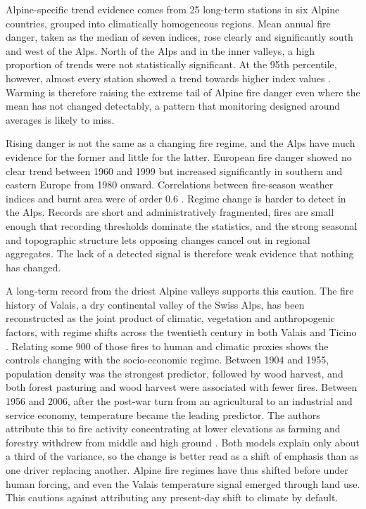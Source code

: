 \documentclass[11pt,a4paper]{article}
\begin{document}
Alpine-specific trend evidence comes from 25 long-term stations in six Alpine countries, grouped into climatically homogeneous regions. Mean annual fire danger, taken as the median of seven indices, rose clearly and significantly south and west of the Alps. North of the Alps and in the inner valleys, a high proportion of trends were not statistically significant. At the 95th percentile, however, almost every station showed a trend towards higher index values \citep{wastl_recent_2012}. Warming is therefore raising the extreme tail of Alpine fire danger even where the mean has not changed detectably, a pattern that monitoring designed around averages is likely to miss.

Rising danger is not the same as a changing fire regime, and the Alps have much evidence for the former and little for the latter. European fire danger showed no clear trend between 1960 and 1999 but increased significantly in southern and eastern Europe from 1980 onward. Correlations between fire-season weather indices and burnt area were of order 0.6 \citep{venalainen_temporal_2014}. Regime change is harder to detect in the Alps. Records are short and administratively fragmented, fires are small enough that recording thresholds dominate the statistics, and the strong seasonal and topographic structure lets opposing changes cancel out in regional aggregates. The lack of a detected signal is therefore weak evidence that nothing has changed.

A long-term record from the driest Alpine valleys supports this caution. The fire history of Valais, a dry continental valley of the Swiss Alps, has been reconstructed as the joint product of climatic, vegetation and anthropogenic factors, with regime shifts across the twentieth century in both Valais and Ticino \citep{zumbrunnen_reconstructing_2010}. Relating some 900 of those fires to human and climatic proxies shows the controls changing with the socio-economic regime. Between 1904 and 1955, population density was the strongest predictor, followed by wood harvest, and both forest pasturing and wood harvest were associated with fewer fires. Between 1956 and 2006, after the post-war turn from an agricultural to an industrial and service economy, temperature became the leading predictor. The authors attribute this to fire activity concentrating at lower elevations as farming and forestry withdrew from middle and high ground \citep{zumbrunnen_human_2012}. Both models explain only about a third of the variance, so the change is better read as a shift of emphasis than as one driver replacing another. Alpine fire regimes have thus shifted before under human forcing, and even the Valais temperature signal emerged through land use. This cautions against attributing any present-day shift to climate by default.
\end{document}
